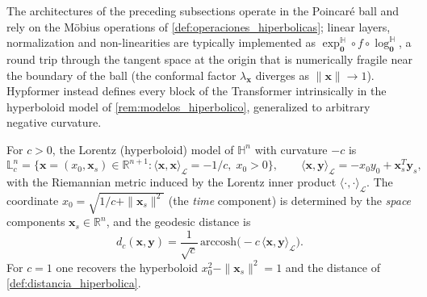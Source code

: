 The architectures of the preceding subsections operate in the Poincaré ball and rely on the Möbius operations of \autoref{def:operaciones_hiperbolicas}; linear layers, normalization and non-linearities are typically implemented as $\exp_{\mathbf{0}}^{\mathbb{H}} \circ f \circ \log_{\mathbf{0}}^{\mathbb{H}}$, a round trip through the tangent space at the origin that is numerically fragile near the boundary of the ball (the conformal factor $\lambda_{\mathbf{x}}$ diverges as $\|\mathbf{x}\| \to 1$). Hypformer \citep{yang2024hypformer} instead defines every block of the \gls{Transformer} intrinsically in the hyperboloid model of \autoref{rem:modelos_hiperbolico}, generalized to arbitrary negative curvature.

\begin{definition}\label{def:modelo_lorentz}
For $c > 0$, the Lorentz (hyperboloid) model of $\mathbb{H}^n$ with curvature $-c$ is
\begin{equation}
    \mathbb{L}^n_c = \{\mathbf{x} = (x_0, \mathbf{x}_s) \in \mathbb{R}^{n+1} : \langle \mathbf{x}, \mathbf{x} \rangle_{\mathcal{L}} = -1/c, \; x_0 > 0\},
    \qquad
    \langle \mathbf{x}, \mathbf{y} \rangle_{\mathcal{L}} = -x_0 y_0 + \mathbf{x}_s^T \mathbf{y}_s,
    \label{eq:modelo_lorentz}
\end{equation}
with the Riemannian metric induced by the Lorentz inner product $\langle \cdot, \cdot \rangle_{\mathcal{L}}$. The coordinate $x_0 = \sqrt{1/c + \|\mathbf{x}_s\|^2}$ (the \emph{time} component) is determined by the \emph{space} components $\mathbf{x}_s \in \mathbb{R}^n$, and the geodesic distance is
\begin{equation}
    d_c(\mathbf{x}, \mathbf{y}) = \frac{1}{\sqrt{c}}\,\text{arccosh}\big(-c\,\langle \mathbf{x}, \mathbf{y} \rangle_{\mathcal{L}}\big).
    \label{eq:distancia_lorentz_curvatura}
\end{equation}
For $c = 1$ one recovers the hyperboloid $x_0^2 - \|\mathbf{x}_s\|^2 = 1$ and the distance of \autoref{def:distancia_hiperbolica}.
\end{definition}

